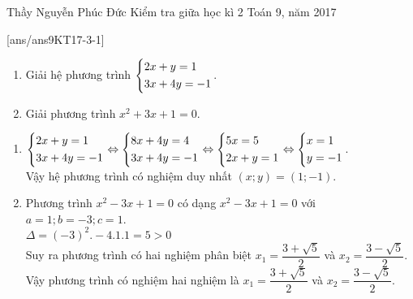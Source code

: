 \begin{name}
{Thầy  Nguyễn Phúc Đức}
{Kiểm tra giữa học kì 2 Toán 9, năm 2017}
\end{name}
\setcounter{ex}{0}
[ans/ans9KT17-3-1]
\begin{ex}%
    \hfill
    \begin{enumerate}
        \item Giải hệ phương trình $\left\{\begin{aligned}& 2x+y = 1 \\ & 3x+4y =-1\end{aligned}\right.$.
        \item Giải phương trình $x^2 +3x+1= 0$.
    \end{enumerate}
\loigiai
    {
       \begin{enumerate}
        \item $\left\{\begin{aligned}&2x+y = 1\\ &3x+4y =-1\end{aligned}\right.\Leftrightarrow \left\{\begin{aligned}&8x+4y=4\\&3x+4y=-1\end{aligned}\right.\Leftrightarrow \left\{\begin{aligned}&5x=5\\&2x+y=1\end{aligned}\right.\Leftrightarrow \left\{\begin{aligned}&x=1\\&y=-1\end{aligned}\right.$. \\
        Vậy hệ phương trình có nghiệm duy nhất $(x ;y) = (1 ;-1)$.
        \item Phương trình $x^2 -3x+1 = 0$ có dạng $x^2 -3x+1 = 0$ với $a= 1; b=-3; c= 1$.\\
        $\Delta=(-3)^2. -4.1.1 = 5 > 0$\\
        Suy ra phương trình có hai nghiệm phân biệt
        $x_1 =\dfrac{3+\sqrt{5}}{2}$ và $x_2 =\dfrac{3-\sqrt{5}}{2}$.\\
        Vậy phương trình có nghiệm hai nghiệm là $x_1 =\dfrac{3+\sqrt{5}}{2}$ và $x_2=\dfrac{3-\sqrt{5}}{2}$.
    \end{enumerate}
    }
\end{ex}

